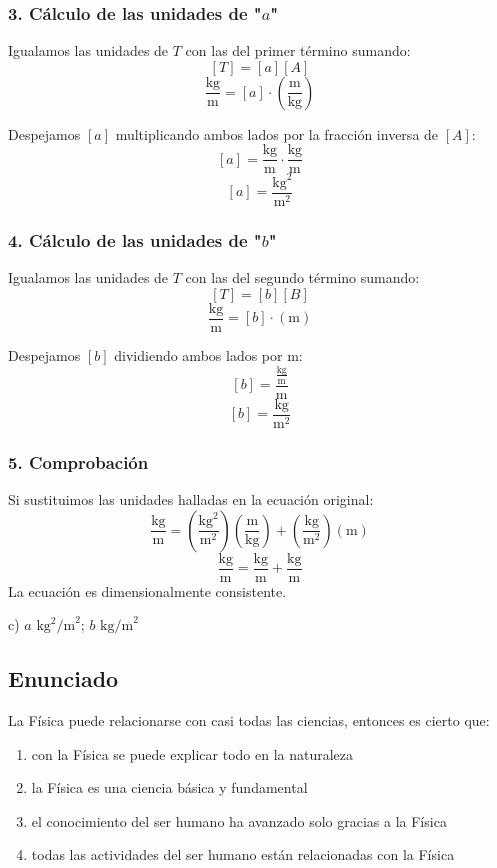\documentclass[12pt, a4paper]{article}
\begin{document}
\subsubsection*{3. Cálculo de las unidades de "$a$"}
Igualamos las unidades de $T$ con las del primer término sumando:
$$ [T] = [a][A] $$
$$ \frac{\text{kg}}{\text{m}} = [a] \cdot \left( \frac{\text{m}}{\text{kg}} \right) $$

Despejamos $[a]$ multiplicando ambos lados por la fracción inversa de $[A]$:
$$ [a] = \frac{\text{kg}}{\text{m}} \cdot \frac{\text{kg}}{\text{m}} $$
$$ [a] = \frac{\text{kg}^2}{\text{m}^2} $$

\subsubsection*{4. Cálculo de las unidades de "$b$"}
Igualamos las unidades de $T$ con las del segundo término sumando:
$$ [T] = [b][B] $$
$$ \frac{\text{kg}}{\text{m}} = [b] \cdot (\text{m}) $$

Despejamos $[b]$ dividiendo ambos lados por $\text{m}$:
$$ [b] = \frac{\frac{\text{kg}}{\text{m}}}{\text{m}} $$
$$ [b] = \frac{\text{kg}}{\text{m}^2} $$

\subsubsection*{5. Comprobación}
Si sustituimos las unidades halladas en la ecuación original:
$$ \frac{\text{kg}}{\text{m}} = \left( \frac{\text{kg}^2}{\text{m}^2} \right) \left( \frac{\text{m}}{\text{kg}} \right) + \left( \frac{\text{kg}}{\text{m}^2} \right) (\text{m}) $$
$$ \frac{\text{kg}}{\text{m}} = \frac{\text{kg}}{\text{m}} + \frac{\text{kg}}{\text{m}} $$
La ecuación es dimensionalmente consistente.

\begin{tcolorbox}[colback=green!5!white, colframe=green!50!black, title=Respuesta Final]
\centering \Large c) $a \text{ kg}^2\text{/m}^2$; $b \text{ kg/m}^2$
\end{tcolorbox}

\newpage


\subsection*{Enunciado}
La Física puede relacionarse con casi todas las ciencias, entonces es cierto que:
\begin{enumerate}[label=\alph*)]
    \item con la Física se puede explicar todo en la naturaleza
    \item la Física es una ciencia básica y fundamental
    \item el conocimiento del ser humano ha avanzado solo gracias a la Física
    \item todas las actividades del ser humano están relacionadas con la Física
\end{enumerate}
\end{document}
